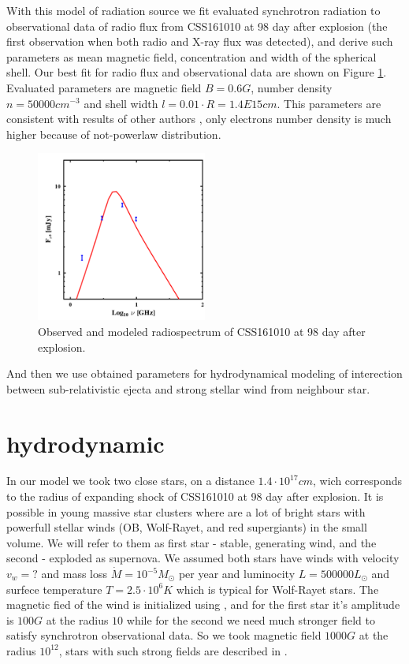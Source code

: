 \documentclass[a4paper,12pt]{extreport}
\begin{document}
With this model of radiation source we fit evaluated synchrotron radiation to observational data of radio flux from CSS161010 at 98 day after explosion (the first observation when both radio and X-ray flux was detected), and derive such parameters as mean magnetic field, concentration and width of the spherical shell. Our best fit for radio flux and observational data are shown on Figure \ref{synchrotron}. Evaluated parameters are magnetic field $B = 0.6 G$, number density $n = 50000{cm}^{-3}$ and shell width $l = 0.01\cdot R = 1.4E15 cm$. This parameters are consistent with results of other authors \cite{Coppejans2020}, only electrons number density is much higher because of not-powerlaw distribution. 
\begin{figure}
	\centering
	\includegraphics[width=0.5\textwidth]{./fig/radiation2.png} 
	\caption{Observed and modeled radiospectrum of CSS161010 at 98 day after explosion.}
	\label{synchrotron}
\end{figure}

And then we use obtained parameters for hydrodynamical modeling of interection between sub-relativistic ejecta and strong stellar wind from neighbour star.
\section{hydrodynamic}\label{hydrodynamic}
In our model we took two close stars, on a distance $1.4\cdot10^{17} cm$, wich corresponds to the radius of expanding shock of CSS161010 at 98 day after explosion. It is  possible in young massive star clusters where are a lot of bright stars with powerfull stellar winds (OB, Wolf-Rayet, and red supergiants) in the small volume. We will refer to them as first star - stable, generating wind, and the second - exploded as supernova. We assumed both stars have winds with velocity $v_w = ?$ and mass loss $\dot{M} = 10^{-5} M_\odot $ per year and luminocity $L=500000 L_\odot$ and surfece temperature $T = 2.5\cdot10^6 K$ which is typical for Wolf-Rayet stars. The magnetic fied of the wind is initialized using \cite{}, and for the first star  it's amplitude is $100 G$ at the radius $10$ while for the second we need much stronger field to satisfy synchrotron observational data. So we took magnetic field $1000 G$ at the radius $10^{12}$, stars with such strong fields are described in \cite{}.
\end{document}
